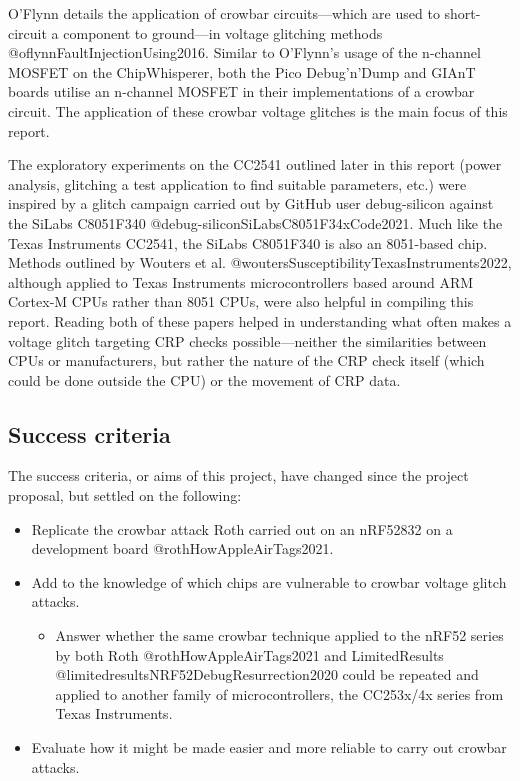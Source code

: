 O'Flynn details the application of crowbar circuits---which are used to
short-circuit a component to ground---in voltage glitching methods
@oflynnFaultInjectionUsing2016. Similar to O'Flynn's usage of the
n-channel MOSFET on the ChipWhisperer, both the Pico Debug'n'Dump and
GIAnT boards utilise an n-channel MOSFET in their implementations of a
crowbar circuit. The application of these crowbar voltage glitches is
the main focus of this report.

The exploratory experiments on the CC2541 outlined later in this report
(power analysis, glitching a test application to find suitable
parameters, etc.) were inspired by a glitch campaign carried out by
GitHub user debug-silicon against the SiLabs C8051F340
@debug-siliconSiLabsC8051F34xCode2021. Much like the Texas Instruments
CC2541, the SiLabs C8051F340 is also an 8051-based chip. Methods
outlined by Wouters et al. @woutersSusceptibilityTexasInstruments2022,
although applied to Texas Instruments microcontrollers based around ARM
Cortex-M CPUs rather than 8051 CPUs, were also helpful in compiling this
report. Reading both of these papers helped in understanding what often
makes a voltage glitch targeting CRP checks possible---neither the
similarities between CPUs or manufacturers, but rather the nature of the
CRP check itself (which could be done outside the CPU) or the movement
of CRP data.

\hypertarget{success-criteria}{%
\subsection{Success criteria}\label{success-criteria}}

The success criteria, or aims of this project, have changed since the
project proposal, but settled on the following:

\begin{itemize}
\tightlist
\item
  Replicate the crowbar attack Roth carried out on an nRF52832 on a
  development board @rothHowAppleAirTags2021.
\item
  Add to the knowledge of which chips are vulnerable to crowbar voltage
  glitch attacks.

  \begin{itemize}
  \tightlist
  \item
    Answer whether the same crowbar technique applied to the nRF52
    series by both Roth @rothHowAppleAirTags2021 and LimitedResults
    @limitedresultsNRF52DebugResurrection2020 could be repeated and
    applied to another family of microcontrollers, the CC253x/4x series
    from Texas Instruments.
  \end{itemize}
\item
  Evaluate how it might be made easier and more reliable to carry out
  crowbar attacks.
\end{itemize}

